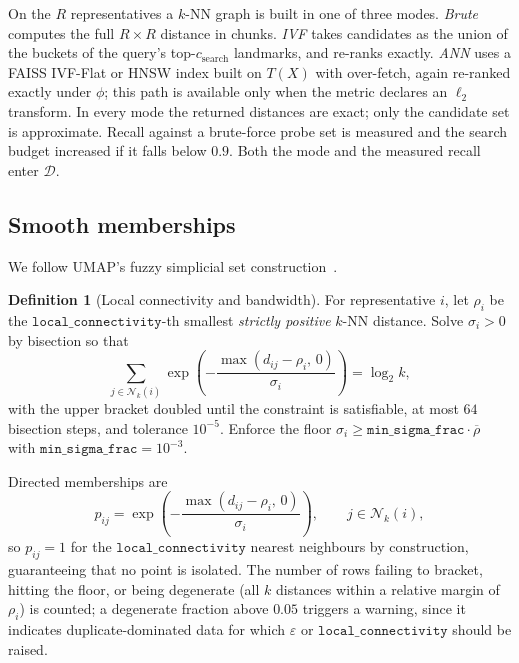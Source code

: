 \documentclass[12pt]{iopart}
\theoremstyle{definition}
\newtheorem{definition}{Definition}
\theoremstyle{plain}
\theoremstyle{remark}
\newcommand{\Nb}{\mathcal{N}}
\newcommand{\code}[1]{\texttt{#1}}
\begin{document}
On the $R$ representatives a $k$-NN graph is built in one of three modes.
\emph{Brute} computes the full $R\times R$ distance in chunks. \emph{IVF} takes
candidates as the union of the buckets of the query's top-$c_{\mathrm{search}}$
landmarks, and re-ranks exactly. \emph{ANN} uses a FAISS IVF-Flat or HNSW index
built on $T(X)$ with over-fetch, again re-ranked exactly under $\phi$; this
path is available only when the metric declares an $\ell_2$ transform. In every
mode the returned distances are exact; only the candidate set is approximate.
Recall against a brute-force probe set is measured and the search budget
increased if it falls below $0.9$. Both the mode and the measured recall enter
$\mathcal{D}$.

\subsection{Smooth memberships}
\label{sec:smoothknn}

We follow UMAP's fuzzy simplicial set
construction~\cite{mcinnes2018umap,spivak2012fuzzy}.

\begin{definition}[Local connectivity and bandwidth]
\label{def:smoothknn}
For representative $i$, let $\rho_i$ be the $\code{local\_connectivity}$-th
smallest \emph{strictly positive} $k$-NN distance. Solve $\sigma_i>0$ by
bisection so that
\begin{equation}
\label{eq:sigma}
\sum_{j\in\Nb_k(i)}
\exp\!\left(-\frac{\max(d_{ij}-\rho_i,\,0)}{\sigma_i}\right)
=
\log_2 k ,
\end{equation}
with the upper bracket doubled until the constraint is satisfiable, at most
$64$ bisection steps, and tolerance $10^{-5}$. Enforce the floor
$\sigma_i\ge\code{min\_sigma\_frac}\cdot\overline{\rho}$ with
$\code{min\_sigma\_frac}=10^{-3}$.
\end{definition}

Directed memberships are
\begin{equation}
\label{eq:pij}
p_{ij}
=
\exp\!\left(-\frac{\max(d_{ij}-\rho_i,\,0)}{\sigma_i}\right),
\qquad j\in\Nb_k(i),
\end{equation}
so $p_{ij}=1$ for the $\code{local\_connectivity}$ nearest neighbours by
construction, guaranteeing that no point is isolated. The number of rows
failing to bracket, hitting the floor, or being degenerate (all $k$ distances
within a relative margin of $\rho_i$) is counted; a degenerate fraction above
$0.05$ triggers a warning, since it indicates duplicate-dominated data for
which $\varepsilon$ or $\code{local\_connectivity}$ should be raised.
\end{document}
